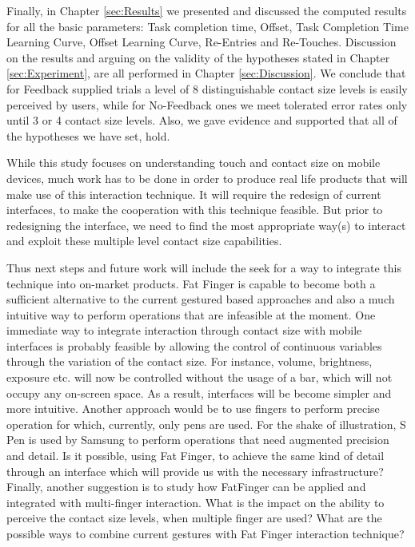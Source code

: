 Finally, in Chapter \ref{sec:Results} we presented and discussed the computed results for all the basic parameters: Task completion time, Offset, Task Completion Time Learning Curve, Offset Learning Curve, Re-Entries and Re-Touches. Discussion on the results and arguing on the validity of the hypotheses stated in Chapter \ref{sec:Experiment}, are all performed in Chapter \ref{sec:Discussion}. We conclude that for Feedback supplied trials a level of 8 distinguishable contact size levels is easily perceived by users, while for No-Feedback ones we meet tolerated error rates only until 3 or 4 contact size levels. Also, we gave evidence and supported that all of the hypotheses we have set, hold.

While this study focuses on understanding touch and contact size on mobile devices, much work has to be done in order to produce real life products that will make use of this interaction technique. It will require the redesign of current interfaces, to make the cooperation with this technique feasible. But prior to redesigning the interface, we need to find the most appropriate way(s) to interact and exploit these multiple level contact size capabilities.

Thus next steps and future work will include the seek for a way to integrate this technique into on-market products. Fat Finger is capable to become both a sufficient alternative to the current gestured based approaches and also a much intuitive way to perform operations that are infeasible at the moment. 
One immediate way to integrate interaction through contact size with mobile interfaces is probably feasible by allowing the control of continuous variables through the variation of the contact size. For instance, volume, brightness, exposure etc. will now be controlled without the usage of a bar, which will not occupy any on-screen space. As a result, interfaces will be become simpler and more intuitive.
Another approach would be to use fingers to perform precise operation for which, currently, only pens are used. For the shake of illustration, S Pen is used by Samsung to perform operations that need augmented precision and detail. Is it possible, using Fat Finger, to achieve the same kind of detail through an interface which will provide us with the necessary infrastructure?
Finally, another suggestion is to study how FatFinger can be applied and integrated with multi-finger interaction. What is the impact on the ability to perceive the contact size levels, when multiple finger are used? What are the possible ways to combine current gestures with Fat Finger interaction technique? 


